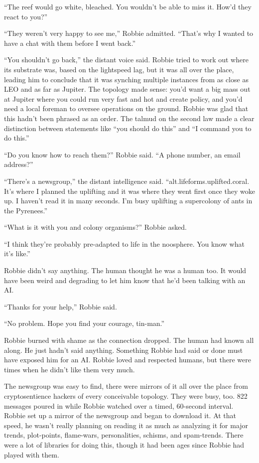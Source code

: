 “The reef would go white, bleached. You wouldn’t be able to miss
it. How’d they react to you?”

“They weren’t very happy to see me,” Robbie admitted. “That’s why I
wanted to have a chat with them before I went back.”

“You shouldn’t go back,” the distant voice said. Robbie tried to
work out where its substrate was, based on the lightspeed lag, but
it was all over the place, leading him to conclude that it was
synching multiple instances from as close as LEO and as far as
Jupiter. The topology made sense: you’d want a big mass out at
Jupiter where you could run very fast and hot and create policy,
and you’d need a local foreman to oversee operations on the ground.
Robbie was glad that this hadn’t been phrased as an order. The
talmud on the second law made a clear distinction between
statements like “you should do this” and “I command you to do
this.”

“Do you know how to reach them?” Robbie said. “A phone number, an
email address?”

“There’s a newsgroup,” the distant intelligence said.
“alt.lifeforms.uplifted.coral. It’s where I planned the uplifting
and it was where they went first once they woke up. I haven’t read
it in many seconds. I’m busy uplifting a supercolony of ants in the
Pyrenees.”

“What is it with you and colony organisms?” Robbie asked.

“I think they’re probably pre-adapted to life in the noosphere. You
know what it’s like.”

Robbie didn’t say anything. The human thought he was a human too.
It would have been weird and degrading to let him know that he’d
been talking with an AI.

“Thanks for your help,” Robbie said.

“No problem. Hope you find your courage, tin-man.”

Robbie burned with shame as the connection dropped. The human had
known all along. He just hadn’t said anything. Something Robbie had
said or done must have exposed him for an AI. Robbie loved and
respected humans, but there were times when he didn’t like them
very much.

The newsgroup was easy to find, there were mirrors of it all over
the place from cryptosentience hackers of every conceivable
topology. They were busy, too. 822 messages poured in while Robbie
watched over a timed, 60-second interval. Robbie set up a mirror of
the newsgroup and began to download it. At that speed, he wasn’t
really planning on reading it as much as analyzing it for major
trends, plot-points, flame-wars, personalities, schisms, and
spam-trends. There were a lot of libraries for doing this, though
it had been ages since Robbie had played with them.

